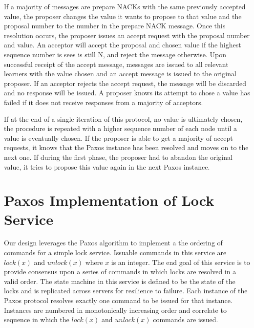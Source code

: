 \documentclass{article}
\begin{document}
If a majority of messages are prepare NACKs with the same previously accepted value, the proposer changes the value it wants to propose to that value and the proposal number to the number in the prepare NACK message.
Once this resolution occurs, the proposer issues an accept request with the proposal number and value.
An acceptor will accept the proposal and chosen value if the highest sequence number is sees is still N, and reject the message otherwise.
Upon successful receipt of the accept message, messages are issued to all relevant learners with the value chosen and an accept message is issued to the original proposer.
If an acceptor rejects the accept request, the message will be discarded and no response will be issued.
A proposer knows its attempt to chose a value has failed if it does not receive responses from a majority of acceptors.

If at the end of a single iteration of this protocol, no value is ultimately chosen, the procedure is repeated with a higher sequence number of each node until a value is eventually chosen.
If the proposer is able to get a majority of accept requests, it knows that the Paxos instance has been resolved and moves on to the next one.
If during the first phase, the proposer had to abandon the original value, it tries to propose this value again in the next Paxos instance.


\section{Paxos Implementation of Lock Service}

Our design leverages the Paxos algorithm to implement a the ordering of commands for a simple lock service.
Issuable commands in this service are $lock(x)$ and $unlock(x)$ where $x$ is an integer.
The end goal of this service is to provide consensus upon a series of commands in which locks are resolved in a valid order.
The state machine in this service is defined to be the state of the locks and is replicated across servers for resilience to failure.
Each instance of the Paxos protocol resolves exactly one command to be issued for that instance.
Instances are numbered in monotonically increasing order and correlate to sequence in which the $lock(x)$ and $unlock(x)$ commands are issued.
\end{document}
